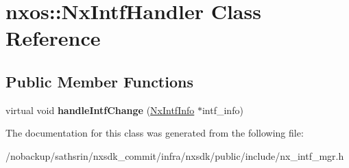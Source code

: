 \hypertarget{classnxos_1_1NxIntfHandler}{\section{nxos\-:\-:Nx\-Intf\-Handler Class Reference}
\label{classnxos_1_1NxIntfHandler}
}
\subsection*{Public Member Functions}
\begin{DoxyCompactItemize}
\item 
\hypertarget{classnxos_1_1NxIntfHandler_a19a4599d0179e5cdafbab54d5836544a}{virtual void {\bfseries handle\-Intf\-Change} (\hyperlink{classnxos_1_1NxIntfInfo}{Nx\-Intf\-Info} $\ast$intf\-\_\-info)}\label{classnxos_1_1NxIntfHandler_a19a4599d0179e5cdafbab54d5836544a}

\end{DoxyCompactItemize}


The documentation for this class was generated from the following file\-:\begin{DoxyCompactItemize}
\item 
/nobackup/sathsrin/nxsdk\-\_\-commit/infra/nxsdk/public/include/nx\-\_\-intf\-\_\-mgr.\-h\end{DoxyCompactItemize}
